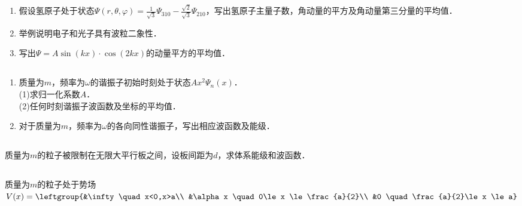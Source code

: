 
\subsection{ }
\begin{enumerate}
\item 假设氢原子处于状态$\Psi (r,\theta,\varphi)=\frac{1}{\sqrt{3}}\Psi_{310}-\frac{\sqrt{2}}{\sqrt{3}}\Psi_{210}$，写出氢原子主量子数，角动量的平方及角动量第三分量的平均值．
\item 举例说明电子和光子具有波粒二象性．
\item 写出$\Psi = A \sin(kx)\cdot\cos(2kx)$的动量平方的平均值．
\end{enumerate}
\subsection{ }
\begin{enumerate}
\item 质量为$m$，频率为$\omega$的谐振子初始时刻处于状态$Ax^2\Psi_n(x)$．\\
(1)求归一化系数$A$．\\
(2)任何时刻谐振子波函数及坐标的平均值．
\item 对于质量为$m$，频率为$\omega$的各向同性谐振子，写出相应波函数及能级．
\end{enumerate}
\subsection{ }
质量为$m$的粒子被限制在无限大平行板之间，设板间距为$d$，求体系能级和波函数．
\subsection{ }
质量为$m$的粒子处于势场$V(x)=\leftgroup{&\infty \quad x<0,x>a\\ &\alpha x \quad 0\le x \le \frac{a}{2}\\ &0 \quad \frac{a}{2}\le x \le a} $